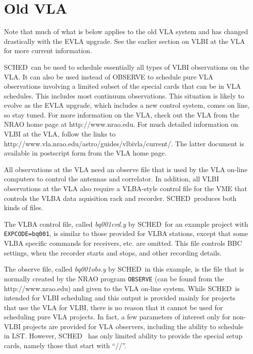 \documentclass{report}
\newcommand{\schedb}{{\sc SCHED~}}
\begin{document}
\section{\label{SEC:OLDVLA}Old VLA}

Note that much of what is below applies to the old VLA system and 
has changed drastically with the EVLA upgrade. See the
earlier section on VLBI at the VLA for more current information.

\schedb can be used to schedule essentially all types of VLBI
observations on the VLA.  It can also be used instead of {\sc OBSERVE}
to schedule pure VLA observations involving a limited subset of the
special cards that can be in VLA schedules.  This includes most
continuum observations.  This situation is likely to evolve as the EVLA
upgrade, which includes a new control system, comes on line, so stay
tuned.  For more information on the VLA, check out
the VLA from the NRAO home page at  {http://www.nrao.edu}.  For much detailed
information on VLBI at the VLA, follow the links to
{http://www.vla.nrao.edu/astro/guides/vlbivla/current/}.  The latter
document is available in postscript form from the VLA home page.

All observations at the VLA need an observe file that is used by the
VLA on-line computers to control the antennas and correlator.  In
addition, all VLBI observations at the VLA also require a VLBA-style
control file for the VME that controls the VLBA data aquisition rack
and recorder.  \schedb produces both kinds of files.

The VLBA control file, called {\sl bq001crd.y} by \schedb for an
example project with {\tt EXPCODE=bq001}, is similar to those provided
for VLBA stations, except that some VLBA specific commands for
receivers, etc. are omitted. This file controls BBC settings, when the
recorder starts and stops, and other recording details.

The observe file, called {\sl bq001obs.y} by \schedb in this example,
is the file that is normally created by the NRAO program {\tt OBSERVE}
(can be found from the 
{http://www.nrao.edu}) and given to the VLA on-line system. While
\schedb is intended for VLBI scheduling and this output is provided
mainly for projects that use the VLA for VLBI, there is no reason that
it cannot be used for scheduling pure VLA projects. In fact, a few
parameters of interest only for non-VLBI projects are provided for VLA
observers, including the ability to schedule in LST. However, \schedb
has only limited ability to provide the special setup cards, namely
those that start with ``//''.
\end{document}
